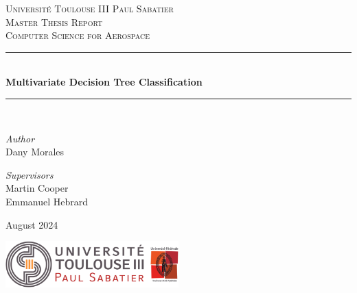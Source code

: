 \documentclass[12pt]{report}
\theoremstyle{definition}
\theoremstyle{definition}
\theoremstyle{definition}
\begin{document}
\begin{titlepage}
    \newcommand{\HRule}{\rule{\linewidth}{0.5mm}} %
    \center
    \textsc{\LARGE Université Toulouse III Paul Sabatier}\\[2.5cm]
    \textsc{\Large Master Thesis Report}\\[0.5cm]
    \textsc{\large Computer Science for Aerospace}\\[2.5cm]

    \HRule\\[0.5cm]
    {\huge \bf Multivariate Decision Tree Classification}\\[0.5cm]
    \HRule\\[1.5cm]

    \begin{minipage}{0.4\textwidth}
		\begin{flushleft}
			\large
			\textit{Author}\\
			Dany Morales
		\end{flushleft}
	\end{minipage}
    \begin{minipage}{0.4\textwidth}
		\begin{flushright}
			\large
			\textit{Supervisors}\\
			Martin Cooper\\
            Emmanuel Hebrard
		\end{flushright}
	\end{minipage}

    \vfill
    \large August 2024

    \includegraphics[width=0.5\textwidth]{logo.png}
\end{titlepage}
\end{document}
